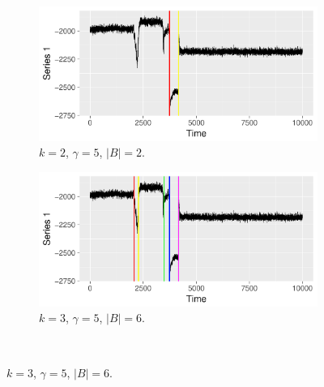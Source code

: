 \begin{figure}[H]
  \centering
  \begin{subfigure}{0.45\textwidth}
    \centering
    \includegraphics[width = \textwidth]{best/best_k_2_gamma_5_colour.pdf}
    \caption{$k = 2 $, $\gamma = 5$, $|B| = 2$.}
  \label{fig:best_2}
  \end{subfigure}
 \begin{subfigure}{0.45\textwidth}
    \centering
    \includegraphics[width = \textwidth]{best/best_k_3_gamma_5_colour.pdf}
    \caption{$k = 3 $, $\gamma = 5$, $|B| = 6$.}
  \label{fig:best_3}
  \end{subfigure} \\


\end{figure}
